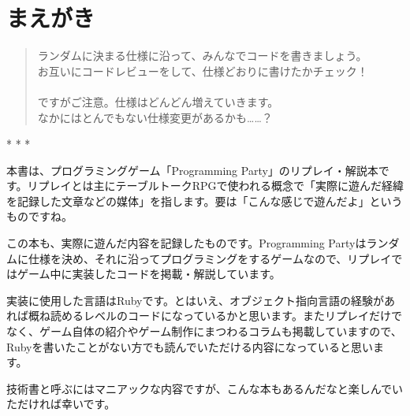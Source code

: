 \documentclass[index]{subfiles}
\begin{document}
  \chapter*{まえがき}
  
\begin{quote}
\noindent
ランダムに決まる仕様に沿って、みんなでコードを書きましょう。 \\
お互いにコードレビューをして、仕様どおりに書けたかチェック！ \\
\\
ですがご注意。仕様はどんどん増えていきます。\\
なかにはとんでもない仕様変更があるかも……？ 
\end{quote}

\begin{center}
* * *
\end{center}

本書は、プログラミングゲーム「Programming Party」のリプレイ・解説本です。リプレイとは主にテーブルトークRPGで使われる概念で「実際に遊んだ経緯を記録した文章などの媒体」を指します。要は「こんな感じで遊んだよ」というものですね。

この本も、実際に遊んだ内容を記録したものです。Programming Partyはランダムに仕様を決め、それに沿ってプログラミングをするゲームなので、リプレイではゲーム中に実装したコードを掲載・解説しています。

実装に使用した言語はRubyです。とはいえ、オブジェクト指向言語の経験があれば概ね読めるレベルのコードになっているかと思います。またリプレイだけでなく、ゲーム自体の紹介やゲーム制作にまつわるコラムも掲載していますので、Rubyを書いたことがない方でも読んでいただける内容になっていると思います。

技術書と呼ぶにはマニアックな内容ですが、こんな本もあるんだなと楽しんでいただければ幸いです。
\end{document}
